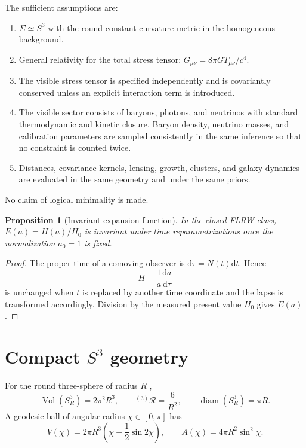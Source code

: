 \documentclass[
  aps,
  prd,
  reprint,
  superscriptaddress,
  nofootinbib,
  floatfix,
  longbibliography
]{revtex4-2}
\theoremstyle{plain}
\newtheorem{proposition}[theorem]{Proposition}
\theoremstyle{definition}
\theoremstyle{remark}
\newcommand{\dd}{\mathrm d}
\newcommand{\Vol}{\operatorname{Vol}}
\newcommand{\diam}{\operatorname{diam}}
\begin{document}
The sufficient assumptions are:
\begin{enumerate}
\item $\Sigma\simeq S^3$ with the round constant-curvature metric in the
homogeneous background.
\item General relativity for the total stress tensor:
$G_{\mu\nu}=8\pi G T_{\mu\nu}/c^4$.
\item The visible stress tensor is specified independently and is covariantly
conserved unless an explicit interaction term is introduced.
\item The visible sector consists of baryons, photons, and neutrinos with
standard thermodynamic and kinetic closure.  Baryon density, neutrino masses,
and calibration parameters are sampled consistently in the same inference so that no
constraint is counted twice.
\item Distances, covariance kernels, lensing, growth, clusters, and galaxy
dynamics are evaluated in the same geometry and under the same priors.
\end{enumerate}
No claim of logical minimality is made.

\begin{proposition}[Invariant expansion function]
In the closed-FLRW class, $E(a)=H(a)/H_0$ is invariant under time
reparametrizations once the normalization $a_0=1$ is fixed.
\end{proposition}

\begin{proof}
The proper time of a comoving observer is $\dd\tau=N(t)\dd t$.  Hence
\[
H=\frac{1}{a}\frac{\dd a}{\dd\tau}
\]
is unchanged when $t$ is replaced by another time coordinate and the lapse is
transformed accordingly.  Division by the measured present value $H_0$ gives
$E(a)$.
\end{proof}

\section{Compact \texorpdfstring{$S^3$}{S3} geometry}

For the round three-sphere of radius $R$ \cite{Wald1984,HawkingEllis1973,doCarmo1992},
\begin{equation}
\Vol(S^3_R)=2\pi^2R^3,\qquad
{}^{(3)}\mathcal R=\frac{6}{R^2},\qquad
\diam(S^3_R)=\pi R .
\label{eq:s3_invariants}
\end{equation}
A geodesic ball of angular radius $\chi\in[0,\pi]$ has
\begin{equation}
V(\chi)=2\pi R^3\left(\chi-\frac12\sin2\chi\right),\qquad
A(\chi)=4\pi R^2\sin^2\chi .
\label{eq:ball}
\end{equation}
\end{document}
